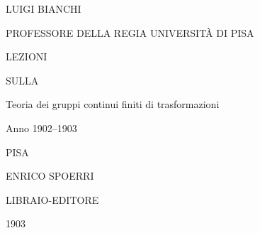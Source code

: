 \documentclass[11pt]{book}
\begin{document}
\begin{titlepage}
\centering
{\Large LUIGI BIANCHI\par}
\vspace{0.4em}
{\small PROFESSORE DELLA REGIA UNIVERSITÀ DI PISA\par}
\vfill
{\Huge LEZIONI\par}
\vspace{1.5em}
{\large SULLA\par}
\vspace{1.5em}
{\Large Teoria dei gruppi continui finiti di trasformazioni\par}
\vspace{2em}
{\large Anno 1902--1903\par}
\vfill
{\Large PISA\par}
{\large ENRICO SPOERRI\par}
{\small LIBRAIO-EDITORE\par}
\vspace{0.5em}
{\large 1903\par}
\end{titlepage}

\frontmatter
\end{document}
